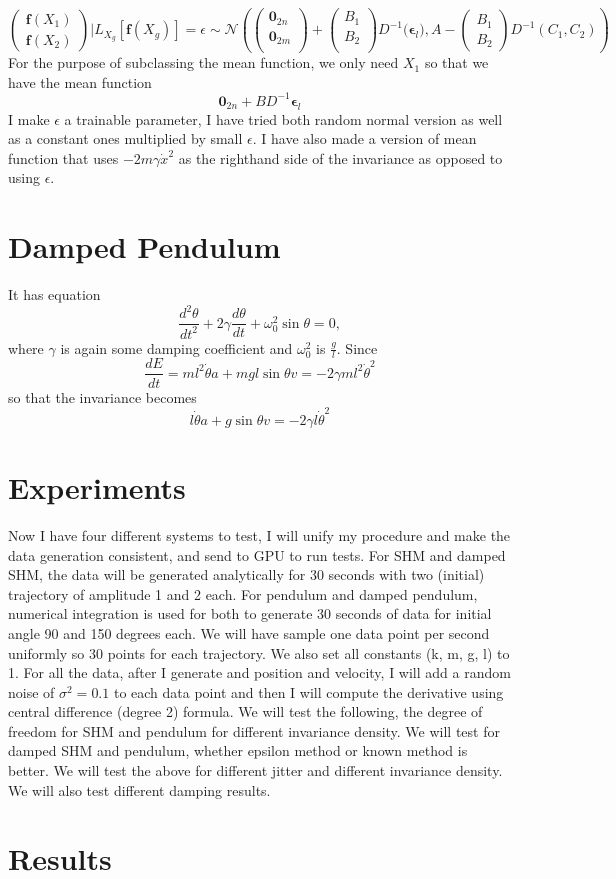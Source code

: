 \documentclass{article}
\begin{document}
$$
\begin{pmatrix}
  \mathbf{f}(X_1)\\
  \mathbf{f}(X_2)
\end{pmatrix}|L_{X_g}[\mathbf{f}(X_g)]=\epsilon
\sim\mathcal{N}
\left(
\begin{pmatrix}
  \mathbf{0}_{2n}\\
  \mathbf{0}_{2m}\\
\end{pmatrix}
+
\begin{pmatrix}
  B_1\\B_2\\
\end{pmatrix}
D^{-1}
\bigg(\mathbf{\epsilon}_l\bigg)
,
A-\begin{pmatrix}
  B_1 \\B_2
\end{pmatrix}D^{-1}\left(C_1, C_2\right)
\right)
$$
For the purpose of subclassing the mean function, we only need $X_1$ so that we have the mean function $$\mathbf{0}_{2n}+BD^{-1}\mathbf{\epsilon}_l$$
I make $\epsilon$ a trainable parameter, I have tried both random normal version as well as a constant ones multiplied by small $\epsilon$.
I have also made a version of mean function that uses $-2m\gamma\dot{x}^2$ as the righthand side of the invariance as opposed to using $\epsilon$.
\section*{Damped Pendulum}
It has equation
$$
\frac{d^2\theta}{dt^2} + 2\gamma\frac{d\theta}{dt} + \omega_0^2\sin\theta = 0, 
$$
where $\gamma$ is again some damping coefficient and $\omega_0^2$ is $\frac{g}{l}$.
Since 
$$
\frac{dE}{dt} = ml^2\dot{\theta}a+mgl\sin\theta v = -2\gamma ml^2\dot{\theta}^2
$$
so that the invariance becomes 
$$
l\dot{\theta}a+g\sin\theta v = -2\gamma l\dot{\theta}^2
$$
\section*{Experiments}
Now I have four different systems to test, I will unify my procedure and make the data generation consistent, and send to GPU to run tests. 
For SHM and damped SHM, the data will be generated analytically for 30 seconds with two (initial) trajectory of amplitude 1 and 2 each.
For pendulum and damped pendulum, numerical integration is used for both to generate 30 seconds of data for initial angle 90 and 150 degrees each.
We will have sample one data point per second uniformly so 30 points for each trajectory.
We also set all constants (k, m, g, l) to 1.
For all the data, after I generate and position and velocity, I will add a random noise of $\sigma^2=0.1$ to each data point and then I will compute the derivative using central difference (degree 2) formula.
We will test the following, the degree of freedom for SHM and pendulum for different invariance density.
We will test for damped SHM and pendulum, whether epsilon method or known method is better.
We will test the above for different jitter and different invariance density.
We will also test different damping results.
\section*{Results}
\end{document}
